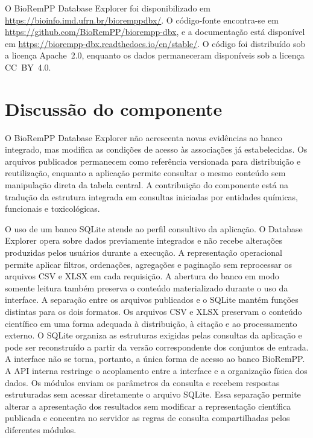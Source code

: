 O BioRemPP Database Explorer foi disponibilizado em
\url{https://bioinfo.imd.ufrn.br/bioremppdbx/}. O código-fonte encontra-se em
\url{https://github.com/BioRemPP/biorempp-dbx}, e a documentação está
disponível em
\url{https://biorempp-dbx.readthedocs.io/en/stable/}. O código foi distribuído sob a licença Apache~2.0, enquanto os dados
permaneceram disponíveis sob a licença CC~BY~4.0.

\section{Discussão do componente}
\label{sec:c2-discussao}

O BioRemPP Database Explorer não acrescenta novas evidências ao banco
integrado, mas modifica as condições de acesso às associações já
estabelecidas. Os arquivos publicados permanecem como referência versionada
para distribuição e reutilização, enquanto a aplicação permite consultar o
mesmo conteúdo sem manipulação direta da tabela central. A contribuição do
componente está na tradução da estrutura integrada em consultas iniciadas por
entidades químicas, funcionais e toxicológicas.

O uso de um banco SQLite atende ao perfil consultivo da aplicação. O
Database Explorer opera sobre dados previamente integrados e não recebe
alterações produzidas pelos usuários durante a execução. A representação
operacional permite aplicar filtros, ordenações, agregações e paginação sem
reprocessar os arquivos CSV e XLSX em cada requisição. A abertura do banco em
modo somente leitura também preserva o conteúdo materializado durante o uso
da interface. A separação entre os arquivos publicados e o SQLite mantém funções distintas
para os dois formatos. Os arquivos CSV e XLSX preservam o conteúdo científico
em uma forma adequada à distribuição, à citação e ao processamento externo. O
SQLite organiza as estruturas exigidas pelas consultas da aplicação e pode ser
reconstruído a partir da versão correspondente dos conjuntos de entrada. A
interface não se torna, portanto, a única forma de acesso ao banco BioRemPP. A API interna restringe o acoplamento entre a interface e a organização física
dos dados. Os módulos enviam os parâmetros da consulta e recebem respostas
estruturadas sem acessar diretamente o arquivo SQLite. Essa separação permite
alterar a apresentação dos resultados sem modificar a representação
científica publicada e concentra no servidor as regras de consulta
compartilhadas pelos diferentes módulos.

